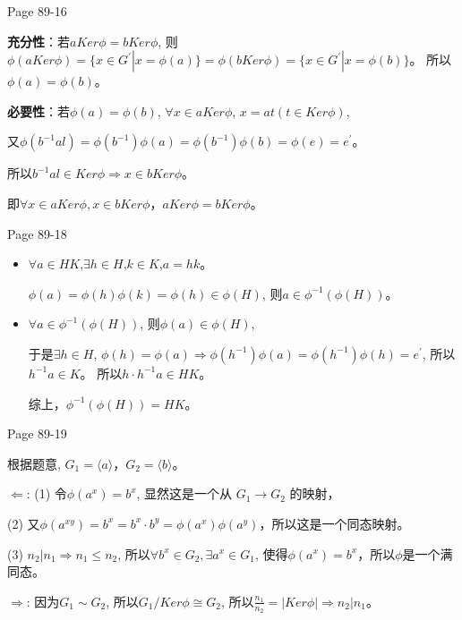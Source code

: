 \documentclass{ximera}
\begin{document}
\begin{problem} Page 89-16
    \begin{solution}
        \textbf{充分性}：若$aKer \phi = b Ker\phi$, 
        则$\phi(aKer \phi) = \{ x \in G^{'} | x = \phi(a) \} = \phi(bKer \phi) = \{ x \in G^{'} | x = \phi(b) \}$。
        所以$\phi(a) = \phi(b)$。

        \textbf{必要性}：若$\phi(a)=\phi(b)$, $\forall x \in aKer \phi$, $x = at(t \in Ker \phi)$, 
        
        又$\phi(b^{-1}al)=\phi(b^{-1})\phi(a)=\phi(b^{-1})\phi(b)=\phi(e)=e^{'}$。
        
        所以$b^{-1}al \in Ker \phi \Rightarrow x \in bKer \phi$。

        即$\forall x \in a Ker \phi, x \in bKer \phi$，$aKer \phi = bKer \phi$。
    \end{solution}
\end{problem}

\newpage
\begin{problem} Page 89-18
    \begin{solution}
        \begin{itemize}
            \item $\forall a \in HK$,$\exists h \in H$,$k \in K$,$a = hk$。
            
            $\phi(a)=\phi(h)\phi(k)=\phi(h) \in \phi(H)$, 则$a \in \phi^{-1}(\phi(H))$。

            \item $\forall a \in \phi^{-1}(\phi(H))$, 则$\phi(a) \in \phi(H)$, 
            
            于是$\exists h \in H$, $\phi(h)=\phi(a) \Rightarrow \phi(h^{-1})\phi(a)=\phi(h^{-1})\phi(h)=e^{'}$, 所以$h^{-1}a \in K$。
            所以$h\cdot h^{-1}a \in HK$。

            综上，$\phi^{-1}(\phi(H)) = HK$。
        \end{itemize}
    \end{solution}
\end{problem} 

\begin{problem} Page 89-19
    \begin{solution}
        根据题意, $G_1 = \langle a \rangle$，$G_2 = \langle b\rangle$。

        $\Leftarrow$: (1) 令$\phi(a^x) = b^x$, 显然这是一个从 $G_1  \rightarrow G_2$ 的映射，
        
        (2) 又$\phi(a^{xy})=b^x=b^x\cdot b^y=\phi(a^x)\phi(a^y)$，所以这是一个同态映射。
        
        (3) $n_2|n_1 \Rightarrow n_1 \leq n_2$, 所以$\forall b^x \in G_2, \exists a^x \in G_1$, 使得$\phi(a^x)=b^x$，所以$\phi$是一个满同态。

        $\Rightarrow$: 因为$G_1 \sim G_2$, 所以$G_1 / Ker \phi \cong G_2$, 所以$\frac {n_1} {n_2} = |Ker \phi| \Rightarrow n_2 | n_1$。
    \end{solution}    
\end{problem} 
\end{document}
